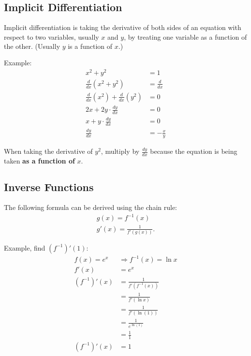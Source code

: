 \documentclass[12pt]{article}
\begin{document}
\subsection{Implicit Differentiation}
Implicit differentiation is taking the derivative of both sides of an equation with respect to two variables, usually $x$ and $y$, by treating one variable as a function of the other. (Usually $y$ is a function of $x$.)

\noindent Example:
\begin{align*}
    x^2 + y^2                                                         & = 1            \\
    \frac{d}{dx} \left( x^2 + y^2 \right)                             & = \frac{d}{dx} \\[6pt]
    \frac{d}{dx} \left( x^2 \right) + \frac{d}{dx} \left( y^2 \right) & = 0            \\[6pt]
    2x + 2y \cdot \frac{dy}{dx}                                       & = 0            \\[6pt]
    x + y \cdot \frac{dy}{dx}                                         & = 0            \\[6pt]
    \frac{dy}{dx}                                                     & = -\frac{x}{y}
\end{align*}

When taking the derivative of $y^2$, multiply by $\frac{dy}{dx}$ because the equation is being taken \textbf{as a function of} $x$.

\subsection{Inverse Functions}
\noindent The following formula can be derived using the chain rule:
\begin{gather*}
    g(x) = f^{-1}(x) \\
    g'(x) = \frac{1}{f'\left( g(x) \right)}.
\end{gather*}

\noindent Example, find $(f^{-1})'(1)$:
\begin{align*}
    f(x) = e^x   & \Rightarrow f^{-1}(x) = \ln{x}          \\
    f'(x)        & = e^x                                   \\
    (f^{-1})'(x) & = \frac{1}{f' \left( f^{-1}(x) \right)} \\[6pt]
                 & = \frac{1}{f'(\ln{x})}                  \\[6pt]
                 & = \frac{1}{f'(\ln{(1)})}                \\[6pt]
                 & = \frac{1}{e^{\ln{(1)}}}                \\[6pt]
                 & = \frac{1}{1}                           \\[6pt]
    (f^{-1})'(x) & = 1
\end{align*}
\end{document}
